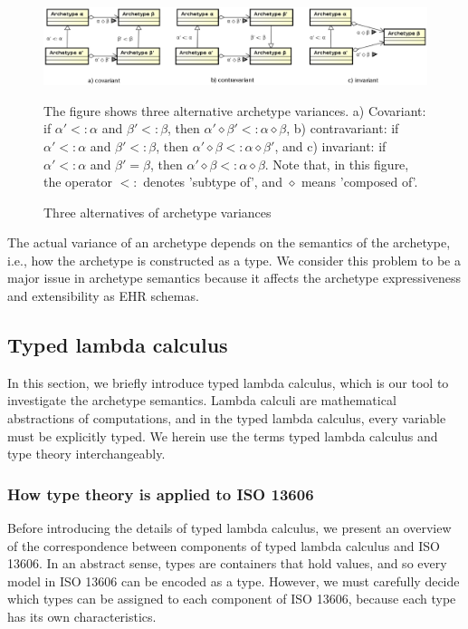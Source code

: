 \documentclass[preprint,3p,onecolumn,times,review]{elsarticle}
\begin{document}
\begin{figure}[!htbp]
  \begin{center}
    \includegraphics[width=16cm]{archetype_variance.eps}  
  \end{center}
  \caption{Three alternatives of archetype variances}\label{fig:archetype_variances}
  The figure shows three alternative archetype variances. a) Covariant: if $\alpha' <: \alpha$ and $\beta' <: \beta$, then $\alpha' \diamond \beta' <: \alpha \diamond \beta$, b) contravariant: if $\alpha' <: \alpha$ and $\beta' <: \beta$, then $\alpha' \diamond \beta <: \alpha \diamond \beta'$, and c) invariant: if $\alpha' <: \alpha$ and $\beta'= \beta$, then $\alpha' \diamond \beta <: \alpha \diamond \beta$.
  Note that, in this figure, the operator $<:$ denotes 'subtype of', and $\diamond$ means 'composed of'.
\end{figure}

The actual variance of an archetype depends on the semantics of the archetype, i.e., how the archetype is constructed as a type. We consider this problem to be a major issue in archetype semantics because it affects the archetype expressiveness and extensibility as EHR schemas.


\subsection{Typed lambda calculus}

In this section, we briefly introduce typed lambda calculus, which is our tool to investigate the archetype semantics. Lambda calculi are mathematical abstractions of computations, and in the typed lambda calculus, every variable must be explicitly typed. 
We herein use the terms typed lambda calculus and type theory interchangeably.

\subsubsection{How type theory is applied to ISO 13606}

Before introducing the details of typed lambda calculus, we present an overview of the correspondence between components of typed lambda calculus and ISO 13606.
In an abstract sense, types are containers that hold values, and so every model in ISO 13606 can be encoded as a type.
However, we must carefully decide which types can be assigned to each component of ISO 13606, because each type has its own characteristics.
\end{document}
